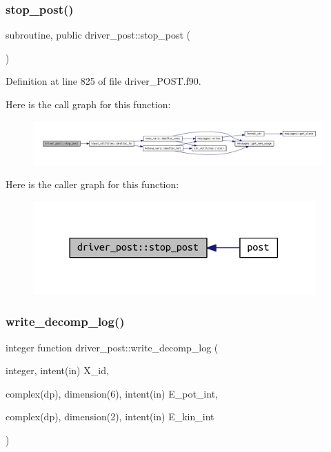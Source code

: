 \subsubsection{\texorpdfstring{stop\+\_\+post()}{stop\_post()}}
{\footnotesize\ttfamily subroutine, public driver\+\_\+post\+::stop\+\_\+post (\begin{DoxyParamCaption}{ }\end{DoxyParamCaption})}



Definition at line 825 of file driver\+\_\+\+P\+O\+S\+T.\+f90.

Here is the call graph for this function\+:
\nopagebreak
\begin{figure}[H]
\begin{center}
\leavevmode
\includegraphics[width=350pt]{namespacedriver__post_a71f9fb1935222111e1c7cfc15c5d0269_cgraph}
\end{center}
\end{figure}
Here is the caller graph for this function\+:
\nopagebreak
\begin{figure}[H]
\begin{center}
\leavevmode
\includegraphics[width=306pt]{namespacedriver__post_a71f9fb1935222111e1c7cfc15c5d0269_icgraph}
\end{center}
\end{figure}
\mbox{\label{namespacedriver__post_a4981c6c0e63b862c92ba240f43e22e77}} 
\subsubsection{\texorpdfstring{write\+\_\+decomp\+\_\+log()}{write\_decomp\_log()}}
{\footnotesize\ttfamily integer function driver\+\_\+post\+::write\+\_\+decomp\+\_\+log (\begin{DoxyParamCaption}\item[{integer, intent(in)}]{X\+\_\+id,  }\item[{complex(dp), dimension(6), intent(in)}]{E\+\_\+pot\+\_\+int,  }\item[{complex(dp), dimension(2), intent(in)}]{E\+\_\+kin\+\_\+int }\end{DoxyParamCaption})}



